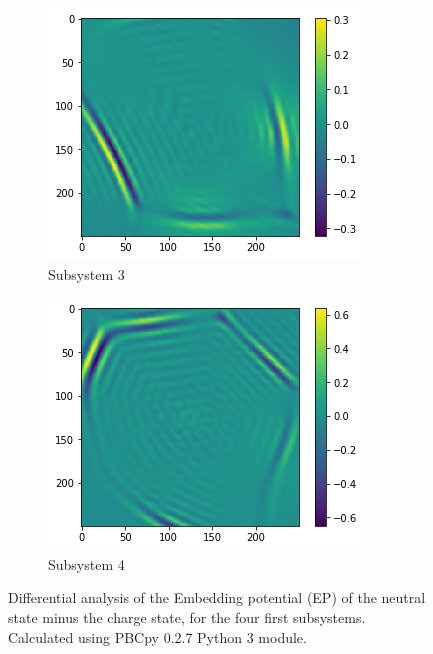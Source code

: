 \documentclass[12pt,a4paper]{article}
\begin{document}
\begin{figure}[!h]
        \begin{subfigure}{0.4\linewidth}
                \includegraphics[width=\linewidth]{Neutral_ChargedEP_3}
                \caption{Subsystem 3}
        \end{subfigure}
        \begin{subfigure}{0.4\linewidth}
                \includegraphics[width=\linewidth]{Neutral_ChargedEP_4}
                \caption{Subsystem 4}
        \end{subfigure}
        \caption{Differential analysis of the Embedding potential (EP) of the neutral state minus the charge state, for the four first subsystems. Calculated using PBCpy 0.2.7 Python 3 module.}
\end{figure}
\end{document}
